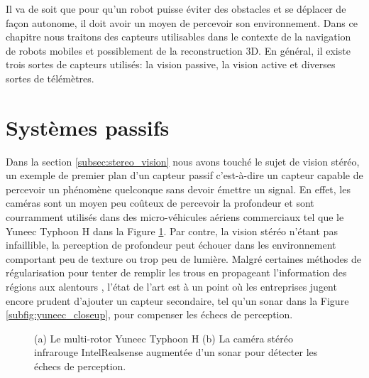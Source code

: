 \label{sec:capteurs}

Il va de soit que pour qu'un robot puisse éviter des obstacles et se déplacer de façon autonome, il doit avoir un moyen de percevoir son environnement. Dans ce chapitre nous traitons des capteurs utilisables dans le contexte de la navigation de robots mobiles et possiblement de la reconstruction 3D. En général, il existe trois sortes de capteurs utilisés: la vision passive, la vision active et diverses sortes de télémètres.

\section{Systèmes passifs}

Dans la section \ref{subsec:stereo_vision} nous avons touché le sujet de vision stéréo, un exemple de premier plan d'un capteur passif c'est-à-dire un capteur capable de percevoir un phénomène quelconque sans devoir émettre un signal. En effet, les caméras sont un moyen peu coûteux de percevoir la profondeur et sont courramment utilisés dans des micro-véhicules aériens commerciaux tel que le Yuneec Typhoon H dans la Figure \ref{fig:yuneec}. Par contre, la vision stéréo n'étant pas infaillible, la perception de profondeur peut échouer dans les environnement comportant peu de texture ou trop peu de lumière. Malgré certaines méthodes de régularisation pour tenter de remplir les trous en propageant l'information des régions aux alentours \citep{Hirschmuller2008}, l'état de l'art est à un point où les entreprises jugent encore prudent d'ajouter un capteur secondaire, tel qu'un sonar dans la Figure \ref{subfig:yuneec_closeup}, pour compenser les échecs de perception.

\begin{figure}[ht]
  \centering
  \hfil
  \caption{
    (a) Le multi-rotor Yuneec Typhoon H (b) La caméra stéréo infrarouge IntelRealsense augmentée d'un sonar pour détecter les échecs de perception.
  }
  \label{fig:yuneec}
\end{figure}

